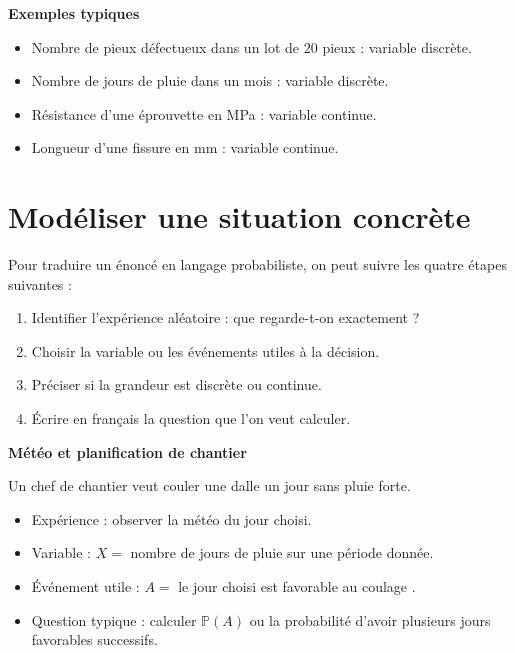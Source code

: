 \begin{Ex}
\textbf{Exemples typiques}
\begin{itemize}
    \item Nombre de pieux défectueux dans un lot de $20$ pieux : variable discrète.
    \item Nombre de jours de pluie dans un mois : variable discrète.
    \item Résistance d'une éprouvette en MPa : variable continue.
    \item Longueur d'une fissure en mm : variable continue.
\end{itemize}
\end{Ex}

\section{Modéliser une situation concrète}

\begin{Meth}
Pour traduire un énoncé en langage probabiliste, on peut suivre les quatre étapes suivantes :
\begin{enumerate}
    \item Identifier l'expérience aléatoire : que regarde-t-on exactement ?
    \item Choisir la variable ou les événements utiles à la décision.
    \item Préciser si la grandeur est discrète ou continue.
    \item Écrire en français la question que l'on veut calculer.
\end{enumerate}
\end{Meth}

\begin{Ex}
\textbf{Météo et planification de chantier}

Un chef de chantier veut couler une dalle un jour sans pluie forte.
\begin{itemize}
    \item Expérience : observer la météo du jour choisi.
    \item Variable : $X =$ nombre de jours de pluie sur une période donnée.
    \item Événement utile : $A =$ \og le jour choisi est favorable au coulage \fg.
    \item Question typique : calculer $\mathbb{P}(A)$ ou la probabilité d'avoir plusieurs jours favorables successifs.
\end{itemize}
\end{Ex}

